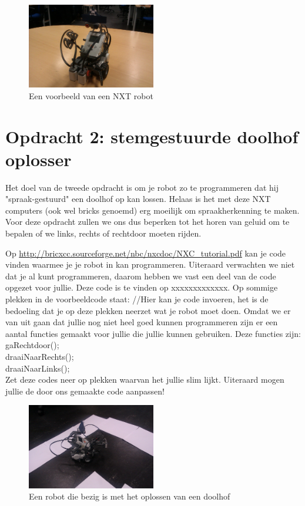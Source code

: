 \documentclass[11pt]{article} %
\begin{document}
\begin{figure}[h!]
	\caption{Een voorbeeld van een NXT robot}
	\centering
	\includegraphics[width=0.5\textwidth]{images/pirate}
\end{figure}

\section*{Opdracht 2: stemgestuurde doolhof oplosser}
Het doel van de tweede opdracht is om je robot zo te programmeren dat hij "spraak-gestuurd" een doolhof op kan lossen. 
Helaas is het met deze NXT computers (ook wel bricks genoemd) erg moeilijk om spraakherkenning te maken. 
Voor deze opdracht zullen we ons dus beperken tot het horen van geluid om te bepalen of we links, rechts of rechtdoor moeten rijden. 

Op \url{http://bricxcc.sourceforge.net/nbc/nxcdoc/NXC_tutorial.pdf} kan je code vinden waarmee je je robot in kan programmeren. 
Uiteraard verwachten we niet dat je al kunt programmeren, daarom hebben we vast een deel van de code opgezet voor jullie. 
Deze code is te vinden op xxxxxxxxxxxxx.
Op sommige plekken in de voorbeeldcode staat: //Hier kan je code invoeren, het is de bedoeling dat je op deze plekken neerzet wat je robot moet doen. 
Omdat we er van uit gaan dat jullie nog niet heel goed kunnen programmeren zijn er een aantal functies gemaakt voor jullie die jullie kunnen gebruiken.
Deze functies zijn: \\
gaRechtdoor();\\
draaiNaarRechts();\\
draaiNaarLinks();\\
Zet deze codes neer op plekken waarvan het jullie slim lijkt. 
Uiteraard mogen jullie de door ons gemaakte code aanpassen!


\begin{figure}[h!]
	\caption{Een robot die bezig is met het oplossen van een doolhof}
	\centering
	\includegraphics[width=0.5\textwidth]{images/maze}
\end{figure}
\end{document}
